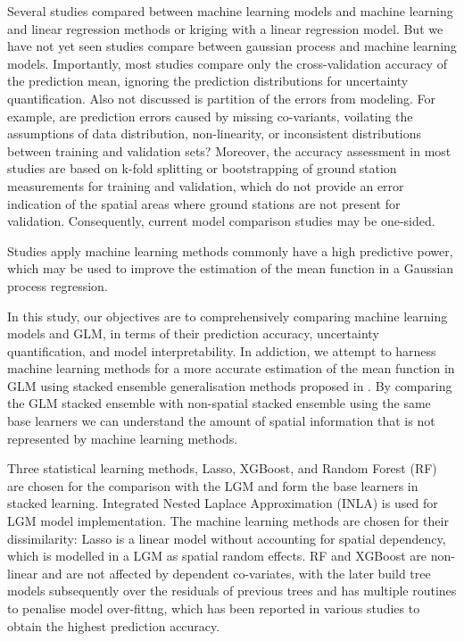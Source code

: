 \documentclass{article}
\begin{document}
Several studies compared between machine learning models and machine learning and linear regression methods \cite{chen2019comparison,kerckhoffs2019performance,luglobal,REN2020105827,machinereview} or kriging with a linear regression model. But we have not yet seen studies compare between gaussian process and machine learning models. Importantly, most studies compare only the cross-validation accuracy of the prediction mean, ignoring the prediction distributions for uncertainty quantification. Also not discussed is partition of the errors from modeling. For example, are prediction errors caused by missing co-variants,  voilating the assumptions of data distribution, non-linearity, or inconsistent distributions between training and validation sets? Moreover, the accuracy assessment in 
most studies are based on k-fold splitting \citep{kerckhoffs2019performance,larkin2017global,REN2020105827}
or bootstrapping \citep{luglobal} of ground station measurements for training and validation, which do not provide an error indication of the spatial areas where ground stations are not present for validation. Consequently, current model comparison studies may be one-sided. 

Studies apply machine learning methods commonly have a high predictive power, which may be used to improve the estimation of the mean function in a Gaussian process regression.  

In this study, our objectives are to comprehensively comparing machine learning models and GLM, in terms of their prediction accuracy, uncertainty quantification, and model interpretability. In addiction, we attempt to harness machine learning methods for a more accurate estimation of the mean function in GLM using stacked ensemble generalisation methods proposed in \cite{stackinla}. By comparing the GLM stacked ensemble with non-spatial stacked ensemble using the same base learners we can understand the amount of spatial information that is not represented by machine learning methods.  
    


 
Three statistical learning methods, Lasso, XGBoost, and Random Forest (RF) are chosen for the comparison with the LGM and form the base learners in stacked learning. Integrated Nested Laplace Approximation (INLA) is used for LGM model implementation.  The machine learning methods are chosen for their dissimilarity: Lasso is a linear model without accounting for spatial dependency, which is modelled in a LGM as spatial random effects. RF and XGBoost are non-linear and are not affected by dependent co-variates, with the later build tree models subsequently over the residuals of previous trees and has multiple routines to penalise model over-fittng, which has been reported in various studies to obtain the highest prediction accuracy.
\end{document}
